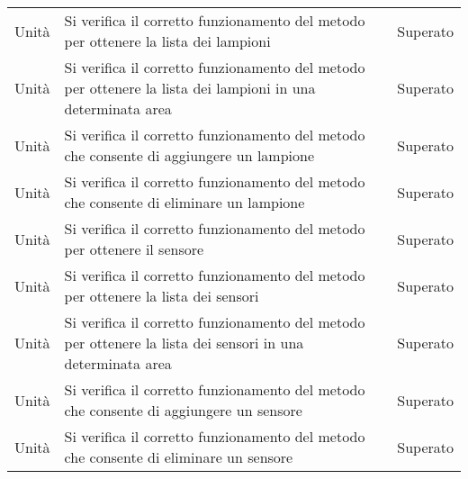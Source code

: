 \begin{center}
\begin{xltabular}{\linewidth}{|l|X|l|}
        Unità & Si verifica il corretto funzionamento del metodo per ottenere la lista dei lampioni & Superato\\
        Unità & Si verifica il corretto funzionamento del metodo per ottenere la lista dei lampioni in una determinata area & Superato\\
        Unità & Si verifica il corretto funzionamento del metodo che consente di aggiungere un lampione & Superato\\
        Unità & Si verifica il corretto funzionamento del metodo che consente di eliminare un lampione & Superato\\
        Unità & Si verifica il corretto funzionamento del metodo per ottenere il sensore & Superato\\
        Unità & Si verifica il corretto funzionamento del metodo per ottenere la lista dei sensori & Superato\\
        Unità & Si verifica il corretto funzionamento del metodo per ottenere la lista dei sensori in una determinata area & Superato\\
        Unità & Si verifica il corretto funzionamento del metodo che consente di aggiungere un sensore & Superato\\
        Unità & Si verifica il corretto funzionamento del metodo che consente di eliminare un sensore & Superato\\


\end{xltabular}
\end{center}
